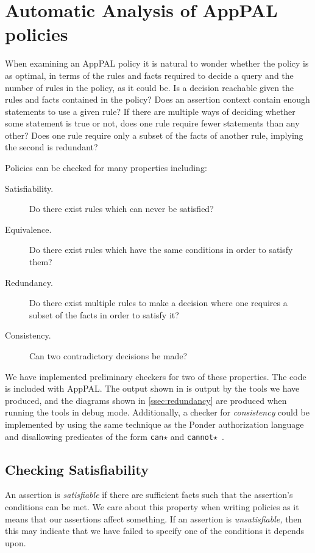 \documentclass[thesis.tex]{subfiles}
\begin{document}
\section{Automatic Analysis of AppPAL policies}
\label{sec:lint}

When examining an AppPAL policy it is natural to wonder whether the
policy is as optimal, in terms of the rules and facts required to
decide a query and the number of rules in the policy, as it could
be. Is a decision reachable given the rules and facts contained in the
policy?  Does an assertion context contain enough statements to use a
given rule? If there are multiple ways of deciding whether some
statement is true or not, does one rule require fewer statements than
any other? Does one rule require only a subset of the facts of another
rule, implying the second is redundant?

Policies can be checked for many properties including:
\begin{description}
\item[Satisfiability.] Do there exist rules which can never be satisfied?
\item[Equivalence.] Do there exist rules which have the same conditions in order to satisfy them?
\item[Redundancy.] Do there exist multiple rules to make a decision where one requires a subset of the facts in order to satisfy it?
\item[Consistency.] Can two contradictory decisions be made?
\end{description}

We have implemented preliminary checkers for two of these properties. The code
is included with AppPAL. The output shown in  is
output by the tools we have produced, and the diagrams shown in
\autoref{ssec:redundancy} are produced when running the tools in debug mode.
Additionally, a checker for \emph{consistency} could be implemented by using the
same technique as the Ponder authorization language and disallowing predicates
of the form \texttt{can$\star$} and
\texttt{cannot$\star$}~\cite{damianou_ponder_2001}.


\subsection{Checking Satisfiability}
\label{ssec:checking-satisfiability}

An assertion is \emph{satisfiable} if there are sufficient facts
such that the assertion's conditions can be met.  We care about this
property when writing policies as it means that our assertions affect
something.  If an assertion is \emph{unsatisfiable,} then this may
indicate that we have failed to specify one of the conditions it
depends upon.
\end{document}

